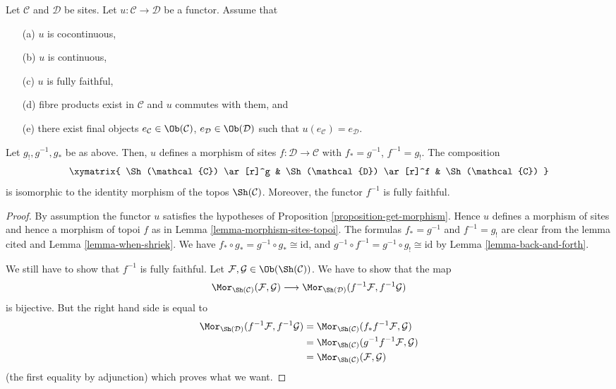 \begin{lemma}
\label{lemma-bigger-site}
Let $\mathcal{C}$ and $\mathcal{D}$ be sites.
Let $u : \mathcal{C} \to \mathcal{D}$ be a functor.
Assume that
\begin{enumerate}
\item[(a)] $u$ is cocontinuous,
\item[(b)] $u$ is continuous,
\item[(c)] $u$ is fully faithful,
\item[(d)] fibre products exist in $\mathcal{C}$ and $u$ commutes with them,
and
\item[(e)] there exist final objects
$e_\mathcal{C} \in \Ob(\mathcal{C})$,
$e_\mathcal{D} \in \Ob(\mathcal{D})$ such that
$u(e_\mathcal{C}) = e_\mathcal{D}$.
\end{enumerate}
Let $g_!, g^{-1}, g_*$ be as above. Then, $u$ defines a morphism of sites
$f : \mathcal{D} \to \mathcal{C}$ with $f_* = g^{-1}$, $f^{-1} = g_!$.
The composition
$$
\xymatrix{
\Sh(\mathcal{C}) \ar[r]^g &
\Sh(\mathcal{D}) \ar[r]^f &
\Sh(\mathcal{C})
}
$$
is isomorphic to the identity morphism of the topos
$\Sh(\mathcal{C})$. Moreover, the functor $f^{-1}$ is fully faithful.
\end{lemma}

\begin{proof}
By assumption the functor $u$ satisfies the hypotheses of
Proposition \ref{proposition-get-morphism}. Hence $u$ defines
a morphism of sites and hence a morphism of topoi $f$ as in
Lemma \ref{lemma-morphism-sites-topoi}. The formulas
$f_* = g^{-1}$ and $f^{-1} = g_!$ are clear from the lemma cited and
Lemma \ref{lemma-when-shriek}.
We have
$f_* \circ g_* = g^{-1} \circ g_* \cong \text{id}$, and
$g^{-1} \circ f^{-1} = g^{-1} \circ g_! \cong \text{id}$
by Lemma \ref{lemma-back-and-forth}.

\medskip\noindent
We still have to show that $f^{-1}$ is fully faithful.
Let $\mathcal{F}, \mathcal{G} \in \Ob(\Sh(\mathcal{C}))$.
We have to show that the map
$$
\Mor_{\Sh(\mathcal{C})}(\mathcal{F}, \mathcal{G})
\longrightarrow
\Mor_{\Sh(\mathcal{D})}(f^{-1}\mathcal{F}, f^{-1}\mathcal{G})
$$
is bijective. But the right hand side is equal to
\begin{align*}
\Mor_{\Sh(\mathcal{D})}(f^{-1}\mathcal{F}, f^{-1}\mathcal{G})
& =
\Mor_{\Sh(\mathcal{C})}(f_*f^{-1}\mathcal{F}, \mathcal{G}) \\
& =
\Mor_{\Sh(\mathcal{C})}(g^{-1}f^{-1}\mathcal{F}, \mathcal{G}) \\
& =
\Mor_{\Sh(\mathcal{C})}(\mathcal{F}, \mathcal{G})
\end{align*}
(the first equality by adjunction) which proves what we want.
\end{proof}

